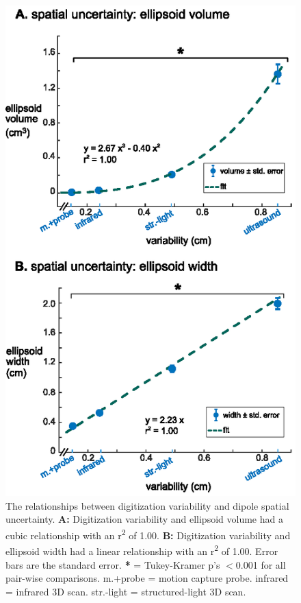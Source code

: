 \documentclass{UCF_ETD}
\newcommand{\tss}[1]{\textsuperscript{#1}}
\begin{document}
\begin{figure}[h!]
    \centering
    \includegraphics{img/result5.eps}
    \caption{The relationships between digitization variability and dipole spatial uncertainty. \textbf{A:} Digitization variability and ellipsoid volume had a cubic relationship with an r\tss{2} of 1.00. \textbf{B:} Digitization variability and ellipsoid width had a linear relationship with an r\tss{2} of 1.00. Error bars are the standard error. \textbf{*} = Tukey-Kramer p's $<$0.001 for all pair-wise comparisons. m.+probe = motion capture probe. infrared = infrared 3D scan. str.-light = structured-light 3D scan.}
    \label{fig:r5}
\end{figure}
\end{document}
